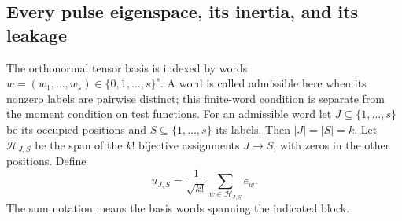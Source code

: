 \documentclass[11pt,a4paper]{article}
\theoremstyle{definition}\newtheorem{definition}[theorem]{Definition}
\begin{document}
\subsection{Every pulse eigenspace, its inertia, and its leakage}

The orthonormal tensor basis is indexed by words
$w=(w_1,\ldots,w_s)\in\{0,1,\ldots,s\}^s$.
A word is called admissible here when its nonzero labels are
pairwise distinct; this finite-word condition is separate from the
moment condition on test functions. For an admissible word let
$J\subseteq\{1,\ldots,s\}$ be its occupied positions and
$S\subseteq\{1,\ldots,s\}$ its labels. Then $|J|=|S|=k$.
Let $\mathcal H_{J,S}$ be the span of the $k!$ bijective
assignments $J\to S$, with zeros in the other positions.
Define
\begin{equation}\tag{FMS24}\label{fms:fms:blockvectors}
 u_{J,S}=\frac1{\sqrt{k!}}\sum_{w\in\mathcal H_{J,S}}e_w.
\end{equation}
The sum notation means the basis words spanning the indicated block.
\end{document}
